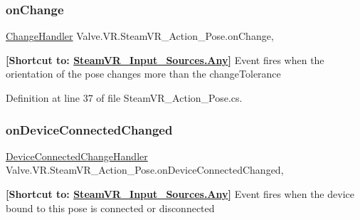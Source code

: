 \mbox{\label{class_valve_1_1_v_r_1_1_steam_v_r___action___pose_a7728910e1c7e84dabcb1c279ba81104f}} 
\subsubsection{\texorpdfstring{onChange}{onChange}}
{\footnotesize\ttfamily \mbox{\hyperlink{class_valve_1_1_v_r_1_1_steam_v_r___action___pose_ac9415e6ad971e70311f59ff1bfb4ea76}{Change\+Handler}} Valve.\+V\+R.\+Steam\+V\+R\+\_\+\+Action\+\_\+\+Pose.\+on\+Change\hspace{0.3cm}{\ttfamily [add]}, {\ttfamily [remove]}}



{\bfseries{\mbox{[}Shortcut to\+: \mbox{\hyperlink{namespace_valve_1_1_v_r_a82e5bf501cc3aa155444ee3f0662853faed36a1ef76a59ee3f15180e0441188ad}{Steam\+V\+R\+\_\+\+Input\+\_\+\+Sources.\+Any}}\mbox{]}}} Event fires when the orientation of the pose changes more than the change\+Tolerance 



Definition at line 37 of file Steam\+V\+R\+\_\+\+Action\+\_\+\+Pose.\+cs.

\mbox{\label{class_valve_1_1_v_r_1_1_steam_v_r___action___pose_a8d9a19a844746eff2dac4a0c75382ecc}} 
\subsubsection{\texorpdfstring{onDeviceConnectedChanged}{onDeviceConnectedChanged}}
{\footnotesize\ttfamily \mbox{\hyperlink{class_valve_1_1_v_r_1_1_steam_v_r___action___pose_a40c6d9862680e8c99781b3a109d94b82}{Device\+Connected\+Change\+Handler}} Valve.\+V\+R.\+Steam\+V\+R\+\_\+\+Action\+\_\+\+Pose.\+on\+Device\+Connected\+Changed\hspace{0.3cm}{\ttfamily [add]}, {\ttfamily [remove]}}



{\bfseries{\mbox{[}Shortcut to\+: \mbox{\hyperlink{namespace_valve_1_1_v_r_a82e5bf501cc3aa155444ee3f0662853faed36a1ef76a59ee3f15180e0441188ad}{Steam\+V\+R\+\_\+\+Input\+\_\+\+Sources.\+Any}}\mbox{]}}} Event fires when the device bound to this pose is connected or disconnected 




